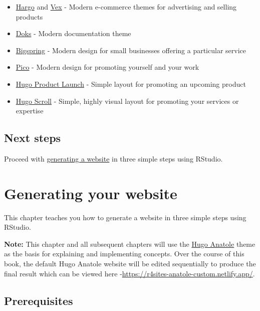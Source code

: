 \documentclass[
]{book}
\begin{document}
\begin{itemize}
\item
  \href{https://themes.gohugo.io/hargo-hugo-ecommerce-theme/}{Hargo} and \href{https://themes.gohugo.io/vex-hugo/}{Vex} - Modern e-commerce themes for advertising and selling products
\item
  \href{https://themes.gohugo.io/doks/}{Doks} - Modern documentation theme
\item
  \href{https://themes.gohugo.io/bigspring-hugo-startup-theme/}{Bigspring} - Modern design for small businesses offering a particular service
\item
  \href{https://themes.gohugo.io/hugo-theme-pico/}{Pico} - Modern design for promoting yourself and your work
\item
  \href{https://themes.gohugo.io/hugo-product-launch/}{Hugo Product Launch} - Simple layout for promoting an upcoming product
\item
  \href{https://themes.gohugo.io/hugo-scroll/}{Hugo Scroll} - Simple, highly visual layout for promoting your services or expertise
\end{itemize}

\hypertarget{next-steps-1}{%
\section{Next steps}\label{next-steps-1}}

Proceed with \protect\hyperlink{generate}{generating a website} in three simple steps using RStudio.

\hypertarget{generate}{%
\chapter{Generating your website}\label{generate}}

This chapter teaches you how to generate a website in three simple steps using RStudio.

\textbf{Note:} This chapter and all subsequent chapters will use the \href{https://themes.gohugo.io/theme/anatole/}{Hugo Anatole} theme as the basis for explaining and implementing concepts. Over the course of this book, the default Hugo Anatole website will be edited sequentially to produce the final result which can be viewed here -\url{https://r4sites-anatole-custom.netlify.app/}.

\hypertarget{prerequisites}{%
\section{Prerequisites}\label{prerequisites}}
\end{document}
